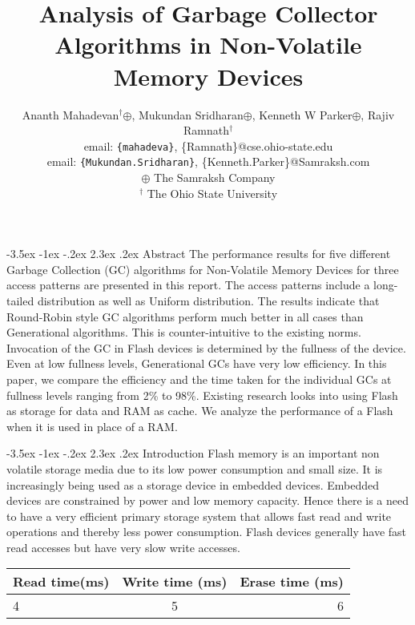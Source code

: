 \documentclass[11pt]{report} %
\title{Analysis of Garbage Collector Algorithms in Non-Volatile Memory Devices}
\author{{Ananth Mahadevan$^\dagger$$\oplus$, Mukundan Sridharan$\oplus$,  Kenneth W Parker$\oplus$, Rajiv Ramnath$^\dagger$}\\
email: {\texttt{\{mahadeva\}}, {\{Ramnath\}}}@cse.ohio-state.edu\\
email: {\texttt{\{Mukundan.Sridharan\}}, {\{Kenneth.Parker\}}}@Samraksh.com\\
$\oplus$ The Samraksh Company \\
$^\dagger$ The Ohio State University \\
}
\begin{document}
\maketitle

\makeatletter
\renewcommand\section{\@startsection {section}{1}{\z@}%
    {-3.5ex \@plus -1ex \@minus -.2ex}%
    {2.3ex \@plus.2ex}%
    {\normalfont\large\bfseries}}
\makeatother

\section{Abstract}
	The performance results for five different Garbage Collection (GC) algorithms for Non-Volatile Memory Devices for three access patterns are presented in this report. The access patterns include a long-tailed distribution as well as Uniform distribution. The results indicate that Round-Robin style GC algorithms perform much better in all cases than Generational algorithms. This is counter-intuitive to the existing norms. Invocation of the GC in Flash devices is determined by the fullness of the device. Even at low fullness levels, Generational GCs have very low efficiency. In this paper, we compare the efficiency and the time taken for the individual GCs at fullness levels ranging from 2\% to 98\%.  Existing research looks into using Flash as storage for data and RAM as cache. We analyze the performance of a Flash when it is used in place of a RAM.


\section{Introduction}
	Flash memory is an important non volatile storage media due to its low power consumption and small size. It is increasingly being used as a storage device in embedded devices. Embedded devices are constrained by power and low memory capacity. Hence there is a need to have a very efficient primary storage system that allows fast read and write operations and thereby less power consumption. Flash devices generally have fast read accesses but have very slow write accesses. \\

\begin{center}
   \begin{tabular} {|  l | c | r | }
       \hline
	Read time(ms) & Write time (ms) & Erase time (ms) \\ \hline
	4 & 5 & 6 \\ 
       \hline
   \end{tabular}
\end{center}
\end{document}
